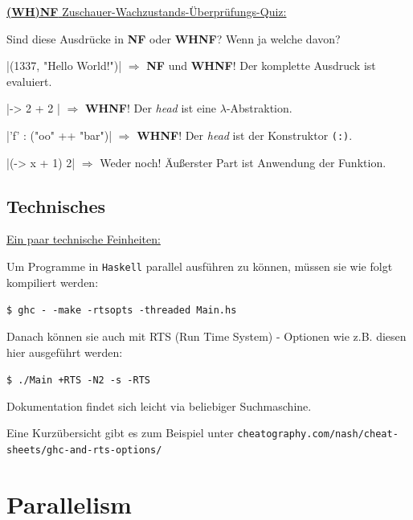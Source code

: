 \documentclass{beamer}
\begin{document}
\begin{frame}[fragile]

\underline{\textbf{(WH)NF} Zuschauer-Wachzustands-Überprüfungs-Quiz:}\smallskip

Sind diese Ausdrücke in \textbf{NF} oder \textbf{WHNF}? Wenn ja welche davon?
\bigskip\pause

|(1337, "Hello World!")|
\pause
$\Rightarrow$ \textbf{NF} und \textbf{WHNF}! Der komplette Ausdruck ist evaluiert.
\pause

|\x -> 2 + 2 |
\pause
$\Rightarrow$ \textbf{WHNF}! Der \emph{head} ist eine $\lambda$-Abstraktion.
\pause

|'f' : ("oo" ++ "bar")|
\pause
$\Rightarrow$ \textbf{WHNF}! Der \emph{head} ist der Konstruktor \texttt{(:)}.
\pause

|(\x -> x + 1) 2|
\pause
$\Rightarrow$ Weder noch! Äußerster Part ist Anwendung der Funktion.

\end{frame}


\subsection{Technisches}

\begin{frame}[fragile]
\underline{Ein paar technische Feinheiten:}\pause\bigskip

Um Programme in \texttt{Haskell} parallel ausführen zu können, müssen sie wie folgt
kompiliert werden:\smallskip

\texttt{\$ ghc -\,-make -rtsopts -threaded Main.hs}
\pause
\bigskip

Danach können sie auch mit RTS (Run Time System) - Optionen wie z.B. diesen hier ausgeführt werden:\smallskip

\texttt{\$ ./Main +RTS -N2 -s -RTS}
\bigskip
\pause

Dokumentation findet sich leicht via beliebiger Suchmaschine.

Eine Kurzübersicht gibt es zum Beispiel unter \texttt{cheatography.com/nash/cheat-sheets/ghc-and-rts-options/}

\end{frame}


\section{Parallelism}
\end{document}
